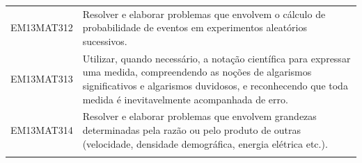 \documentclass[12pt]{extarticle}
\begin{document}
\begin{longtable}{ll}
EM13MAT312 & Resolver e elaborar problemas que envolvem o cálculo de probabilidade de eventos em experimentos aleatórios sucessivos.                                                                                                                                                                                                                                                                                                                                                                                                                                                                                                                                                                                                                                                                                               \\
\rowcolor[HTML]{E0F7FA} 
EM13MAT313 & Utilizar, quando necessário, a notação científica para expressar uma medida, compreendendo as noções de algarismos significativos e algarismos duvidosos, e reconhecendo que toda medida é inevitavelmente acompanhada de erro.                                                                                                                                                                                                                                                                                                                                                                                                                                                                                                                                                                                       \\
\rowcolor[HTML]{FFF} 
EM13MAT314 & Resolver e elaborar problemas que envolvem grandezas determinadas pela razão ou pelo produto de outras (velocidade, densidade demográfica, energia elétrica etc.).                                                                                                                                                                                                                                                                                                                                                                                                                                                                                                                                                                                                                                                    \\
\rowcolor[HTML]{E0F7FA} 

\end{longtable}
\end{document}

